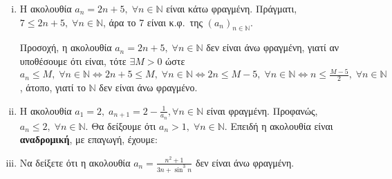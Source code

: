\begin{examples}
\begin{enumerate}[i)]
    \item Η ακολουθία $ a_{n}= 2n+5, \; \forall n \in \mathbb{N} $ είναι κάτω 
      φραγμένη.
      Πράγματι, $ 7 \leq 2n+5, \; \forall n \in \mathbb{N} $, άρα το 
      7 είναι κ.φ.\ της $ (a_{n} )_{n \in \mathbb{N}} $.

      Προσοχή, η ακολουθία $ a_{n}= 2n+5, \; \forall n \in \mathbb{N} $ δεν είναι 
      άνω φραγμένη, γιατί αν υποθέσουμε ότι είναι, τότε $ \exists M>0 $ ώστε 
      $ a_{n} \leq M, \; \forall n \in \mathbb{N} 
      \Leftrightarrow 2n+5 \leq M, \; \forall n \in \mathbb{N} 
      \Leftrightarrow 2n \leq M-5, \; \forall n \in \mathbb{N}
      \Leftrightarrow n \leq \frac{M-5}{2}, \; \forall n \in \mathbb{N} $, άτοπο, 
      γιατί το $ \mathbb{N} $ δεν είναι άνω φραγμένο.

    \item Η ακολουθία $ a_{1}=2, \; a_{n+1}=2 - \frac{1}{a_{n}}, \forall n \in 
      \mathbb{N}$
      είναι φραγμένη. Προφανώς, $ a_{n}\leq 2, \; \forall n \in \mathbb{N} $.
      Θα δείξουμε ότι $ a_{n}>1, \; \forall n \in \mathbb{N} $. Επειδή η ακολουθία 
      είναι \textbf{αναδρομική}, με επαγωγή, έχουμε:

    \item Να δείξετε ότι η ακολουθία $ a_{n} = 
      \frac{n^{2}+1}{3n+ \sin^{3}{n}} $ δεν είναι άνω φραγμένη. 


\end{enumerate}
\end{examples}
